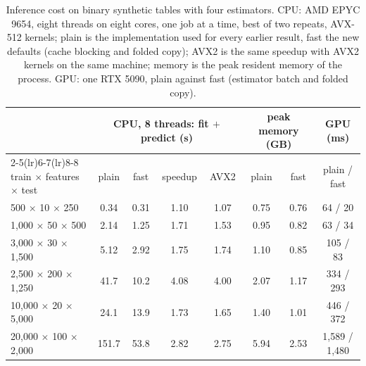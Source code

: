 \documentclass[11pt]{article}
\begin{document}
\begin{table}[t]
\centering
\footnotesize
\setlength{\tabcolsep}{4pt}
\begin{tabular}{lccccccc}
\toprule
& \multicolumn{4}{c}{CPU, 8 threads: fit $+$ predict (s)} & \multicolumn{2}{c}{peak memory (GB)} & GPU (ms) \\
\cmidrule(lr){2-5}\cmidrule(lr){6-7}\cmidrule(lr){8-8}
train $\times$ features $\times$ test & plain & fast & speedup & AVX2 & plain & fast & plain / fast \\
\midrule
500 $\times$ 10 $\times$ 250 & 0.34 & 0.31 & 1.10 & 1.07 & 0.75 & 0.76 & 64 / 20 \\
1,000 $\times$ 50 $\times$ 500 & 2.14 & 1.25 & 1.71 & 1.53 & 0.95 & 0.82 & 63 / 34 \\
3,000 $\times$ 30 $\times$ 1,500 & 5.12 & 2.92 & 1.75 & 1.74 & 1.10 & 0.85 & 105 / 83 \\
2,500 $\times$ 200 $\times$ 1,250 & 41.7 & 10.2 & 4.08 & 4.00 & 2.07 & 1.17 & 334 / 293 \\
10,000 $\times$ 20 $\times$ 5,000 & 24.1 & 13.9 & 1.73 & 1.65 & 1.40 & 1.01 & 446 / 372 \\
20,000 $\times$ 100 $\times$ 2,000 & 151.7 & 53.8 & 2.82 & 2.75 & 5.94 & 2.53 & 1,589 / 1,480 \\
\bottomrule
\end{tabular}
\caption{Inference cost on binary synthetic tables with four estimators. CPU: AMD EPYC 9654, eight threads on
eight cores, one job at a time, best of two repeats, AVX-512 kernels; plain is the implementation used for every
earlier result, fast the new defaults (cache blocking and folded copy); AVX2 is the same speedup with AVX2
kernels on the same machine; memory is the peak resident memory of the process. GPU: one RTX 5090, plain against
fast (estimator batch and folded copy).}
\label{tab:infer}
\end{table}
\end{document}

